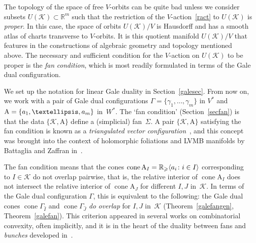 \documentclass[a4paper]{amsart}
\theoremstyle{definition}
\theoremstyle{remark}
\numberwithin{equation}{section}
\def\R{\mathbb R}
\def\R{\mathbb R}
\newcommand{\mb}[1]{{\textbf {\textit#1}}}
\renewcommand{\ge}{\geqslant}
\def\cone{\mathop{\mathrm{cone}}}
\newcommand{\<}{\langle}
\renewcommand{\>}{\rangle}
\begin{document}
The topology of the space of free $V$-orbits can be quite bad unless we consider subsets $U(\mathcal K)\subset\R^m$ such that the restriction of the $V$-action~\eqref{ract} to $U(\mathcal K)$ is \emph{proper}. In this case, the space of orbits $U(\mathcal K)/V$ is Hausdorff and has a smooth atlas of charts transverse to $V$-orbits. It is this quotient manifold $U(\mathcal K)/V$ that features in the constructions of algebraic geometry and topology mentioned above. The necessary and sufficient condition for the $V$-action on $U(\mathcal K)$ to be proper is the \emph{fan condition}, which is most readily formulated in terms of the Gale dual configuration.

We set up the notation for linear Gale duality in Section~\ref{galesec}.
From now on, we work with a pair of Gale dual configurations $\Gamma=\{\gamma_1,\ldots,\gamma_m\}$ in $V^*$ and $\mathrm A=\{\mb a_1,\ldots,\mb a _m\}$ in~$W^*$. The `fan condition' (Section~\ref{secfan}) is that the data $\{\mathcal K,\mathrm A\}$ define a (simplicial) fan~$\Sigma$. A pair $\{\mathcal K,\mathrm A\}$ satisfying the fan condition is known as a \emph{triangulated vector configuration}~\cite{d-r-s10}, and this concept was brought into the context of holomorphic foliations and LVMB manifolds by Battaglia and Zaffran in~\cite{ba-za15}.

The fan condition means that the cones $\cone\mathrm A_I=\R_\ge\langle\mb a_i\colon i\in I\rangle$ corresponding to $I\in\mathcal K$ do not overlap pairwise, that is, the relative interior of $\cone\mathrm A_I$ does not intersect the relative interior of $\cone\mathrm A_J$ for different $I,J$ in~$\mathcal K$. In terms of the Gale dual configuration $\Gamma$, this is equivalent to the following: the Gale dual cones $\cone\Gamma_{\widehat I}$ and $\cone\Gamma_{\widehat J}$ \emph{do overlap} for $I,J$ in~$\mathcal K$ (Theorem~\ref{galefangen}, Theorem~\ref{galefan}). This criterion appeared in several works on combinatorial convexity, often implicitly, and it is in the heart of the duality between fans and \emph{bunches} developed in~\cite[\S2.2]{a-d-h-l15}.
\end{document}
